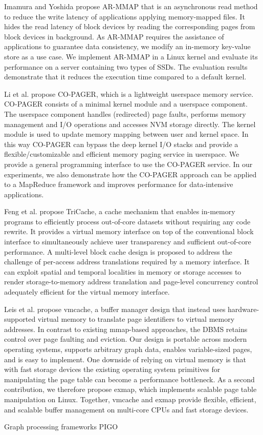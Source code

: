 Imamura and Yoshida \cite{imamura2019poster} propose AR-MMAP that is an asynchronous read method to reduce the write latency of applications applying memory-mapped files. It hides the read latency of block devices by reading the corresponding pages from block devices in background. As AR-MMAP requires the assistance of applications to guarantee data consistency, we modify an in-memory key-value store as a use case. We implement AR-MMAP in a Linux kernel and evaluate its performance on a server containing two types of SSDs. The evaluation results demonstrate that it reduces the execution time compared to a default kernel.

Li et al. \cite{li2019userland} propose CO-PAGER, which is a lightweight userspace memory service. CO-PAGER consists of a minimal kernel module and a userspace component. The userspace component handles (redirected) page faults, performs memory management and I/O operations and accesses NVM storage directly. The kernel module is used to update memory mapping between user and kernel space. In this way CO-PAGER can bypass the deep kernel I/O stacks and provide a flexible/customizable and efficient memory paging service in userspace. We provide a general programming interface to use the CO-PAGER service. In our experiments, we also demonstrate how the CO-PAGER approach can be applied to a MapReduce framework and improves performance for data-intensive applications.

Feng et al. \cite{feng2023tricache} propose TriCache, a cache mechanism that enables in-memory programs to efficiently process out-of-core datasets without requiring any code rewrite. It provides a virtual memory interface on top of the conventional block interface to simultaneously achieve user transparency and sufficient out-of-core performance. A multi-level block cache design is proposed to address the challenge of per-access address translations required by a memory interface. It can exploit spatial and temporal localities in memory or storage accesses to render storage-to-memory address translation and page-level concurrency control adequately efficient for the virtual memory interface.

Leis et al. \cite{leis2023virtual} propose vmcache, a buffer manager design that instead uses hardware-supported virtual memory to translate page identifiers to virtual memory addresses. In contrast to existing mmap-based approaches, the DBMS retains control over page faulting and eviction. Our design is portable across modern operating systems, supports arbitrary graph data, enables variable-sized pages, and is easy to implement. One downside of relying on virtual memory is that with fast storage devices the existing operating system primitives for manipulating the page table can become a performance bottleneck. As a second contribution, we therefore propose exmap, which implements scalable page table manipulation on Linux. Together, vmcache and exmap provide flexible, efficient, and scalable buffer management on multi-core CPUs and fast storage devices.






Graph processing frameworks
PIGO
